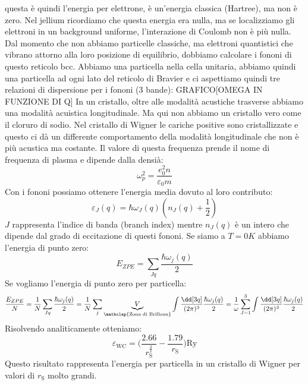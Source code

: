 questa è quindi l'energia per elettrone, è un'energia classica (Hartree), ma non è zero. Nel jellium ricordiamo che questa energia era nulla, ma se localizziamo gli elettroni in un background uniforme, l'interazione di Coulomb non è più nulla.\\
Dal momento che non abbiamo particelle classiche, ma elettroni quantistici che vibrano attorno alla loro posizione di equilibrio, dobbiamo calcolare i fononi di questo reticolo bcc. Abbiamo una particella nella cella unitaria, abbiamo quindi una particella ad ogni lato del reticolo di Bravier e ci aspettiamo quindi tre relazioni di dispersione per i fononi (3 bande):
GRAFICO[OMEGA IN FUNZIONE DI Q]
In un cristallo, oltre alle modalità acustiche trasverse abbiamo una modalità acuistica longitudinale. Ma qui non abbiamo un cristallo vero come il cloruro di sodio. Nel cristallo di Wigner le cariche positive sono cristallizzate e questo ci dà un differente comportamento della modalità longitudinale che non è più acustica ma costante. Il valore di questa frequenza prende il nome di frequenza di plasma e dipende dalla densià:
\begin{equation*}
    \omega_p^2=\frac{e_0^2n}{\varepsilon_0m}
\end{equation*}
Con i fononi possiamo ottenere l'energia media dovuto al loro contributo:
\begin{equation*}
    \varepsilon_J(q)=\hbar\omega_J(q)(n_J(q)+\frac 12)
\end{equation*}
$J$ rappresenta l'indice di banda (branch index) mentre $n_J(q)$ è un intero che dipende dal grado di eccitazione di questi fononi. Se siamo a $T=0K$ abbiamo l'energia di punto zero:
\begin{equation*}
    E_{ZPE}=\sum_{Jq}\frac{\hbar\omega_j(q)}{2}
\end{equation*}
Se vogliamo l'energia di punto zero per particella:
\begin{equation*}
    \frac{E_{ZPE}}{N}=\frac 1N\sum_{Jq}\frac{\hbar\omega_j(q)}{2}=\frac 1N\sum_j\underbrace{V}_{\mathclap{\text{Zona di Brilloun}}}\int \frac{\dd[3{q}]}{(2\pi)^3}\frac{\hbar\omega_j(q)}{2}=\frac{1}{\omega}\sum_{J=1}^3\int \frac{\dd[3{q}]}{(2\pi)^3}\frac{\hbar\omega_j(q)}{2}
\end{equation*}
Risolvendo analiticamente otteniamo:
\begin{equation*}
    \varepsilon_{\text {WC}}=\bigg(\frac{2.66}{r_\text{S}^{\frac 32}}-\frac{1.79}{r_\text{S}}\bigg)\text{Ry}
\end{equation*}
Questo risultato rappresenta l'energia per particella in un cristallo di Wigner per valori di $r_\text{S}$ molto grandi.\\
